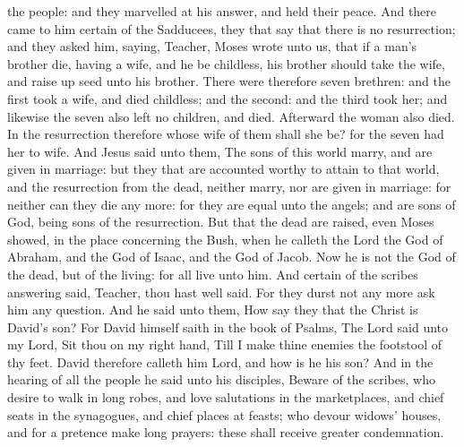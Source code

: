 the people: and they marvelled at his answer, and held their peace.  And there came to him certain of the Sadducees, they that say that there is no resurrection; and they asked him, saying, Teacher, Moses wrote unto us, that if a man’s brother die, having a wife, and he be childless, his brother should take the wife, and raise up seed unto his brother. There were therefore seven brethren: and the first took a wife, and died childless; and the second: and the third took her; and likewise the seven also left no children, and died. Afterward the woman also died. In the resurrection therefore whose wife of them shall she be? for the seven had her to wife. And Jesus said unto them, The sons of this world marry, and are given in marriage: but they that are accounted worthy to attain to that world, and the resurrection from the dead, neither marry, nor are given in marriage: for neither can they die any more: for they are equal unto the angels; and are sons of God, being sons of the resurrection. But that the dead are raised, even Moses showed, in the place concerning the Bush, when he calleth the Lord the God of Abraham, and the God of Isaac, and the God of Jacob. Now he is not the God of the dead, but of the living: for all live unto him. And certain of the scribes answering said, Teacher, thou hast well said. For they durst not any more ask him any question.  And he said unto them, How say they that the Christ is David’s son? For David himself saith in the book of Psalms, The Lord said unto my Lord, Sit thou on my right hand,  Till I make thine enemies the footstool of thy feet.  David therefore calleth him Lord, and how is he his son?  And in the hearing of all the people he said unto his disciples, Beware of the scribes, who desire to walk in long robes, and love salutations in the marketplaces, and chief seats in the synagogues, and chief places at feasts; who devour widows’ houses, and for a pretence make long prayers: these shall receive greater condemnation. 

